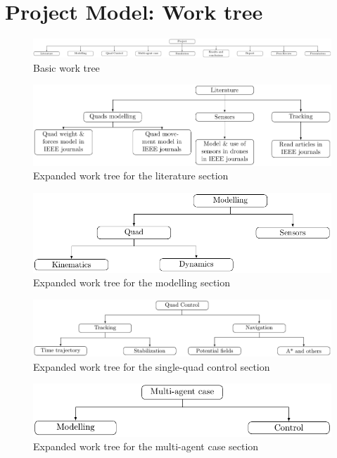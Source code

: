 \documentclass{article}
\begin{document}
	\section{Project Model: Work tree}
		\begin{figure}[H]
				\centering
				\includegraphics[width=1.15\linewidth]{Workplan_work_tree/basic_work_tree_diagram}
				\caption{Basic work tree}
				\label{fig:work_tree_basic}
		\end{figure}
		\begin{figure}[H]
			\centering
			\includegraphics[width=.8\linewidth]{Workplan_work_tree/literature_work_tree_diagram}
			\caption{Expanded work tree for the literature section}
		\end{figure}
		\begin{figure}[H]
			\centering
			\includegraphics[width=.8\linewidth]{Workplan_work_tree/modelling_work_tree_diagram}
			\caption{Expanded work tree for the modelling section}
		\end{figure}
		\begin{figure}[H]
			\centering
			\includegraphics[width=.8\linewidth]{Workplan_work_tree/control_work_tree_diagram}
			\caption{Expanded work tree for the single-quad control section}
		\end{figure}
		\begin{figure}[H]
			\centering
			\includegraphics[width=.8\linewidth]{Workplan_work_tree/multiagent_work_tree_diagram}
			\caption{Expanded work tree for the multi-agent case section}
		\end{figure}
\end{document}
